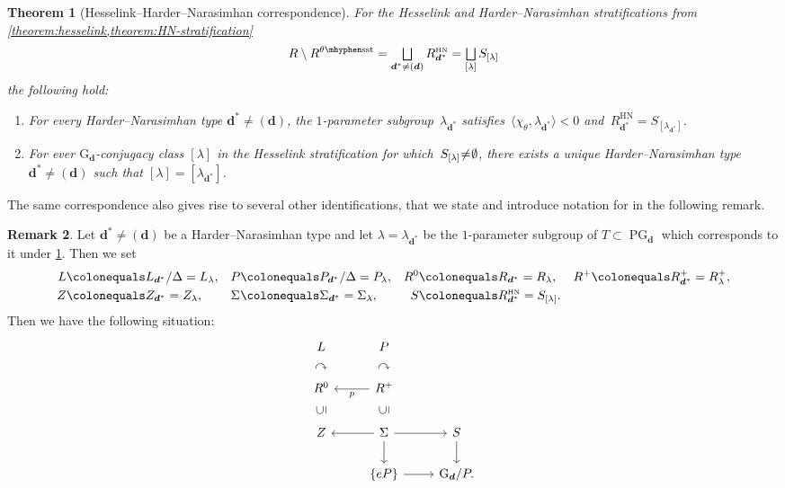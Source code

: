 \documentclass[11pt]{article}
\let\oldbigsqcup\bigsqcup
\renewcommand{\bigsqcup}{\mathop{\textstyle\oldbigsqcup}\displaylimits}
\theoremstyle{plain}
\newtheorem{theorem}{Theorem}[section]
\theoremstyle{definition}
\newtheorem{remark}[theorem]{Remark}
\DeclareMathOperator\PG{PG}
\newcommand\blade[1][]{\Sigma_{#1}}
\newcommand\group[1][\tuple{d}]{\mathrm{G}_{#1}}
\newcommand\HN{\ensuremath{{\scriptscriptstyle\mathrm{HN}}}}
\newcommand\semistable{\ensuremath{\mhyphen\mathrm{sst}}}
\newcommand\tuple[1]{\ensuremath{{\boldsymbol{#1}}}}
\begin{document}
\begin{theorem}[Hesselink--Harder--Narasimhan correspondence]
\label{theorem:HN=hesselink}
For the Hesselink and Harder--Nara\-sim\-han stratifications
from \cref{theorem:hesselink,theorem:HN-stratification}
\begin{equation*}
R \setminus R^{\theta\semistable} = \bigsqcup_{\tuple{d}^* \neq (\tuple{d})} R_{\tuple{d}^*}^{\HN} = \bigsqcup_{[\lambda]} S_{[\lambda]}
\end{equation*}
the following hold:
\begin{enumerate}
\item For every Harder--Narasimhan type $\tuple{d}^* \neq (\tuple{d})$,
the $1$-parameter subgroup~$\lambda_{\tuple{d}^*}$
satisfies~$\langle \chi_\theta,\lambda_{\tuple{d}^*} \rangle < 0$
and~$R_{\tuple{d}^*}^{\HN} = S_{[\lambda_{\tuple{d}^*}]}$.
\item For ever ${\group}$-conjugacy class $[\lambda]$ in the Hesselink stratification for which~\hbox{$S_{[\lambda]} \mkern-4mu\neq\mkern-4mu \emptyset$},
there exists a unique Harder--Narasimhan type $\tuple{d}^* \neq (\tuple{d})$
such that $[\lambda] = [\lambda_{\tuple{d}^*}]$.
\end{enumerate}
\end{theorem}
The same correspondence also gives rise to several other identifications,
that we state and introduce notation for in the following remark.
\begin{remark}
\label{remark:technicalities-and-abbreviations-HN-Hesselink-equivalence}
Let $\tuple{d}^* \neq (\tuple{d})$ be a Harder--Narasimhan type
and let $\lambda = \lambda_{\tuple{d}^*}$ be the $1$-parameter subgroup of $T\subset\PG_{\tuple{d}}$
which corresponds to it under \cref{theorem:HN=hesselink}.
Then we set
\begin{align*}
L &\colonequals L_{\tuple{d}^*}/\Delta = L_\lambda,&
P &\colonequals P_{\tuple{d}^*}/\Delta = P_\lambda,&
R^0 &\colonequals R_{\tuple{d}^*} = R_\lambda, &
R^+ &\colonequals R_{\tuple{d}^*}^+ = R_\lambda^+,\\
Z &\colonequals Z_{\tuple{d}^*} = Z_\lambda,&
\blade &\colonequals \blade[\tuple{d}^*] = \blade[\lambda], &
S &\colonequals R_{\tuple{d}^*}^{\HN} = S_{[\lambda]}.
\end{align*}
Then we have the following situation:
\begin{equation*}
\begin{tikzcd}
L & P \\[-1.5em]
\curvearrowright & \curvearrowright \\[-1.5em]
R^0 & R^+ \arrow{l}{p} \\[-1.5em]
\text{\rotatebox[origin=c]{90}{$\subseteq$}} & \text{\rotatebox[origin=c]{90}{$\subseteq$}} \\[-1.5em]
Z & \Sigma \arrow{l}{} \arrow{r}{} \arrow{d}{} & S \arrow{d}{} \\
& \{eP\} \arrow{r}{} & {\group}/P.
\end{tikzcd}
\end{equation*}
\end{remark}
\end{document}
